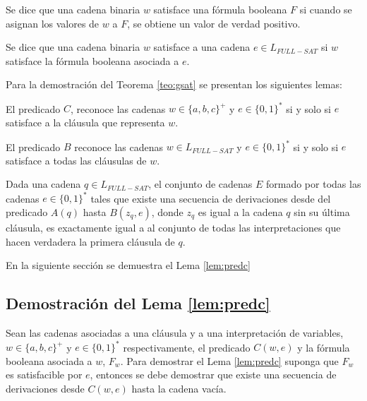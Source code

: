 \begin{definition}
    Se dice que una cadena binaria $w$ satisface una fórmula booleana $F$ si cuando se asignan los valores de $w$ a $F$, se obtiene un valor de verdad positivo.
\end{definition}

\begin{definition}
    Se dice que una cadena binaria $w$ satisface a una cadena $e\in L_{FULL-SAT}$ si $w$ satisface la fórmula booleana asociada a $e$. 
\end{definition}


Para la demostración del Teorema \ref{teo:gsat} se presentan los siguientes lemas:

\begin{lemma}
    \label{lem:predc}
    El predicado $C$, reconoce las cadenas $w\in \{a,b,c\}^+$ y $e\in \{0,1\}^*$ si y solo si $e$ satisface a la cláusula que representa $w$.
\end{lemma}

\begin{lemma}
    \label{lem:predb}
    El predicado $B$ reconoce las cadenas $w\in L_{FULL-SAT}$ y $e\in \{0,1\}^*$ si y solo si $e$ satisface a todas las cláusulas de $w$.
\end{lemma}

\begin{lemma}
    \label{lem:preda}
    Dada una cadena $q\in L_{FULL-SAT}$, el conjunto de cadenas $E$ formado por todas las cadenas $e\in \{0,1\}^*$ tales que existe una secuencia de derivaciones desde del 
    predicado $A(q)$ hasta $B(z_q,e)$, donde $z_q$ es igual a la cadena $q$ sin su última cláusula, es exactamente igual a al conjunto de todas las interpretaciones que hacen verdadera la primera cláusula de $q$.
\end{lemma}

En la siguiente sección se demuestra el Lema \ref{lem:predc}

\subsection{Demostración del Lema \ref{lem:predc}}

Sean las cadenas asociadas a una cláusula y a una interpretación de variables, $w\in \{a,b,c\}^+$ y $e\in \{0,1\}^*$
respectivamente, el predicado $C(w,e)$ y la fórmula booleana asociada a $w$, $F_w$. Para demostrar el Lema 
\ref{lem:predc} suponga que $F_w$ es satisfacible por $e$, entonces se debe demostrar que existe una secuencia 
de derivaciones desde $C(w,e)$ hasta la cadena vacía. 

